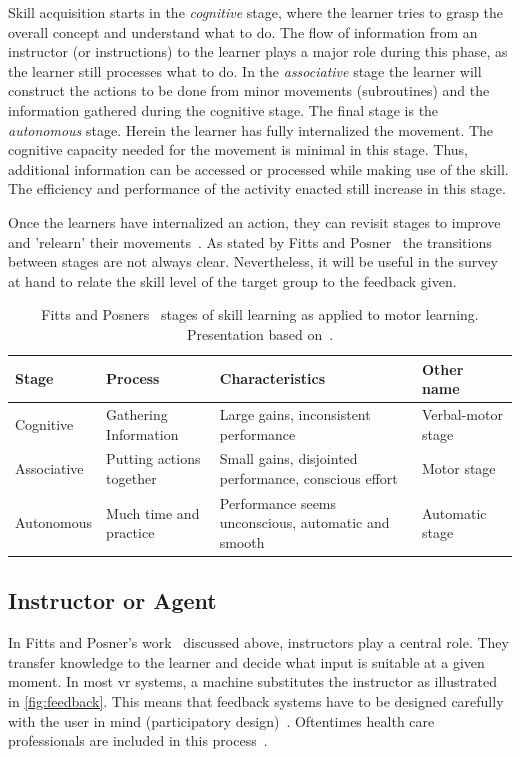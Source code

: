 Skill acquisition starts in the \emph{cognitive} stage, where the learner tries to grasp the overall concept and understand what to do. The flow of information from an instructor (or instructions) to the learner plays a major role during this phase, as the learner still processes what to do. 
In the \emph{associative} stage the learner will construct the actions to be done from minor movements (subroutines) and the information gathered during the cognitive stage.
The final stage is the \emph{autonomous} stage. Herein the learner has fully internalized the movement. The cognitive capacity needed for the movement is minimal in this stage. Thus, additional information can be accessed or processed while making use of the skill. The efficiency and performance of the activity enacted still increase in this stage.

Once the learners have internalized an action, they can revisit stages to improve and 'relearn' their movements~\cite{huber2013AEP}. As stated by Fitts and Posner~\cite{fitts1967HPe} the transitions between stages are not always clear. Nevertheless, it will be useful in the survey at hand to relate the skill level of the target group to the feedback given.

\begin{table}[ht]
\caption[Fitts and Posners stages of skill learning~\cite{fitts1967HPe}.]{Fitts and Posners~\cite{fitts1967HPe} stages of skill learning as applied to motor learning. Presentation based on~\cite{huber2013AEP}.\label{table:1}}
\begin{tabular}{ |p{2.2cm}||p{2.6cm}|p{5.2cm}|p{2.2cm}|  }
    
 \hline
 Stage & Process & Characteristics & Other name\\
 \hline
 \hline
 Cognitive & \raggedright Gathering Information & \raggedright Large gains, inconsistent performance & Verbal-motor stage \\
 \hline
 Associative & \raggedright  Putting actions together & \raggedright Small gains, disjointed performance, conscious effort & Motor stage \\
 \hline
 Autonomous & Much time and practice & Performance seems unconscious, automatic and smooth & Automatic stage \\
 \hline
\end{tabular}
\label{table:stages}
\end{table}

\subsection{Instructor or Agent\label{sec:instructor}}
In Fitts and Posner's work~\cite{fitts1967HPe} discussed above, instructors play a central role. They transfer knowledge to the learner and decide what input is suitable at a given moment. In most \acrshort{vr} systems, a machine substitutes the instructor as illustrated in \autoref{fig:feedback}. This means that feedback systems have to be designed carefully with the user in mind (participatory design)~\cite{davies2003vrf}. Oftentimes health care professionals are included in this process~\cite{hilton2011dem}.

